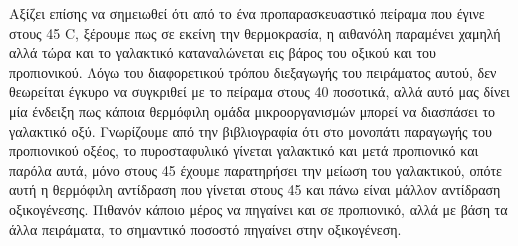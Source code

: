 \documentclass[11pt]{article}
\begin{document}
Αξίζει επίσης να σημειωθεί ότι από το ένα προπαρασκευαστικό πείραμα που έγινε στους 45 C, ξέρουμε πως σε εκείνη την θερμοκρασία, η αιθανόλη παραμένει χαμηλή αλλά τώρα και το γαλακτικό καταναλώνεται εις βάρος του οξικού και του προπιονικού. Λόγω του διαφορετικού τρόπου διεξαγωγής του πειράματος αυτού, δεν θεωρείται έγκυρο να συγκριθεί με το πείραμα στους 40 ποσοτικά, αλλά αυτό μας δίνει μία ένδειξη πως κάποια θερμόφιλη ομάδα μικροοργανισμών μπορεί να διασπάσει το γαλακτικό οξύ. Γνωρίζουμε από την βιβλιογραφία ότι στο μονοπάτι παραγωγής του προπιονικού οξέος, το πυροσταφυλικό γίνεται γαλακτικό και μετά προπιονικό και παρόλα αυτά, μόνο στους 45 έχουμε παρατηρήσει την μείωση του γαλακτικού, οπότε αυτή η θερμόφιλη αντίδραση που γίνεται στους 45 και πάνω είναι μάλλον αντίδραση οξικογένεσης. Πιθανόν κάποιο μέρος να πηγαίνει και σε προπιονικό, αλλά με βάση τα άλλα πειράματα, το σημαντικό ποσοστό πηγαίνει στην οξικογένεση.
\end{document}
